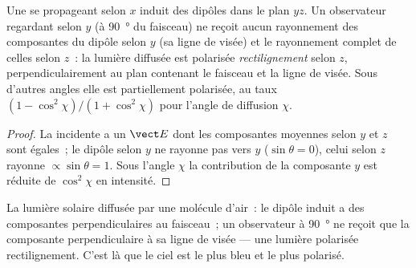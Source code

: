 \begin{proposition}\label{prop:b2:dipole-radiation:polarization}
Une  se propageant selon $x$ induit des dipôles dans le plan $yz$.
Un observateur regardant selon $y$ (à \qty{90}{\degree} du faisceau) ne reçoit
aucun rayonnement des composantes du dipôle selon $y$ (sa ligne de visée)
et le rayonnement complet de celles selon $z$~: la lumière diffusée est
polarisée \emph{rectilignement} selon $z$, perpendiculairement au plan
contenant le faisceau et la ligne de visée. Sous d'autres angles elle est
partiellement polarisée, au taux $(1 - \cos^2\chi)/(1 + \cos^2\chi)$ pour
l'angle de diffusion $\chi$.
\end{proposition}

\begin{proof}
La  incidente a un $\vect E$ dont les composantes moyennes
selon $y$ et $z$ sont égales~; le dipôle selon $y$ ne rayonne pas vers $y$ ($\sin
\theta = 0$), celui selon $z$ rayonne $\propto\sin\theta = 1$. Sous l'angle $\chi$
la contribution de la composante $y$ est réduite de $\cos^2\chi$ en intensité.
\end{proof}

\begin{omfigure}

{\small La lumière solaire diffusée par une molécule d'air~: le dipôle induit a des
composantes perpendiculaires au faisceau~; un observateur à \qty{90}{\degree}
ne reçoit que la composante perpendiculaire à sa ligne de visée ---
une lumière polarisée rectilignement. C'est là que le ciel est le plus bleu et le plus polarisé.}
\end{omfigure}

